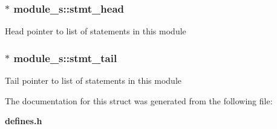 \subsubsection{$\ast$ module\_\-s::stmt\_\-head}\label{structmodule__s_m7}


Head pointer to list of statements in this module 
\subsubsection{$\ast$ module\_\-s::stmt\_\-tail}\label{structmodule__s_m8}


Tail pointer to list of statements in this module 

The documentation for this struct was generated from the following file:\begin{CompactItemize}
\item 
{\bf defines.h}\end{CompactItemize}
